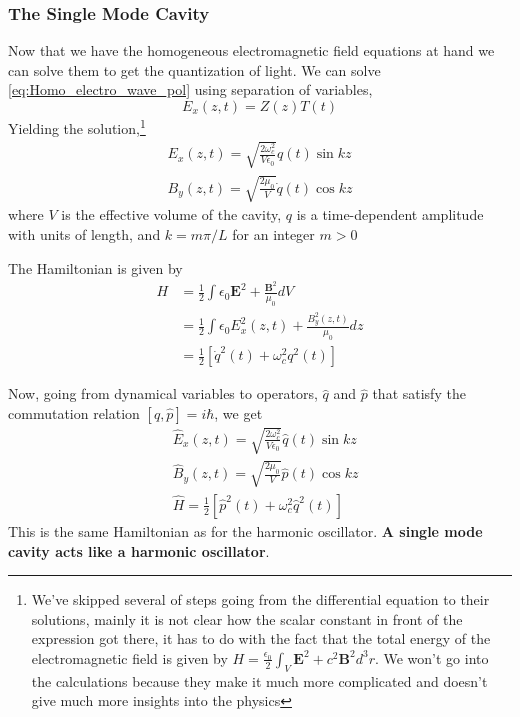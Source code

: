 \documentclass[english, a4paper, 12pt, twoside]{article}
\numberwithin{equation}{section} %
\begin{document}
\subsubsection{The Single Mode Cavity}
Now that we have the homogeneous electromagnetic field equations at hand we can solve them to get the quantization of light.
We can solve \ref{eq:Homo_electro_wave_pol} using separation of variables,
$$E_x(z, t)= Z(z)T(t)$$
Yielding the solution,\footnote{We've skipped several of steps going from the differential equation to their solutions, mainly it is not clear how the scalar constant in front of the expression got there, it has to do with the fact that the total energy of the electromagnetic field is given by $H = \frac{\epsilon_0}{2} \int_V \textbf{E}^2 + c^2 \textbf{B}^2 d^3 r$. We won't go into the calculations because they make it much more complicated and doesn't give much more insights into the physics}
\begin{equation}
    \begin{split}
        E_x(z, t) = \sqrt{\frac{2 \omega_c^2}{V \epsilon_0}}q(t)\sin{kz} \\
        B_y(z, t) = \sqrt{\frac{2 \mu_0}{V}}\dot{q}(t)\cos{kz}
    \end{split}
\end{equation}
where $V$ is the effective volume of the cavity, $q$ is a time-dependent amplitude with units of length, and $k = m\pi/L$ for
an integer $m > 0$

The Hamiltonian is given by
\begin{align}
    H &= \frac{1}{2}\int\epsilon_0 \textbf{E}^2 + \frac{\textbf{B}^2}{\mu_0} dV \\
    &= \frac{1}{2}\int\epsilon_0 E_x^2(z, t) + \frac{B_y^2(z, t)}{\mu_0} dz \\
    &= \frac{1}{2}[\dot{q}^2(t) + \omega_c^2 q^2(t)]
\end{align}

Now, going from dynamical variables to operators, $\hat{q}$ and $\hat{p}$ that satisfy the commutation relation $[\hat{q}, \hat{p}] = i\hbar$, we get
\begin{align}
     &\hat{E}_x(z, t) = \sqrt{\frac{2 \omega_c^2}{V \epsilon_0}}\hat{q}(t)\sin{kz} \\
     &\hat{B}_y(z, t) = \sqrt{\frac{2 \mu_0}{V}}\hat{p}(t)\cos{kz} \\
     &\hat{H} = \frac{1}{2}[\hat{p}^2(t) + \omega_c^2 \hat{q}^2(t)]
\end{align}
This is the same Hamiltonian as for the harmonic oscillator. \textbf{A single mode cavity acts like a harmonic oscillator}.
\end{document}
